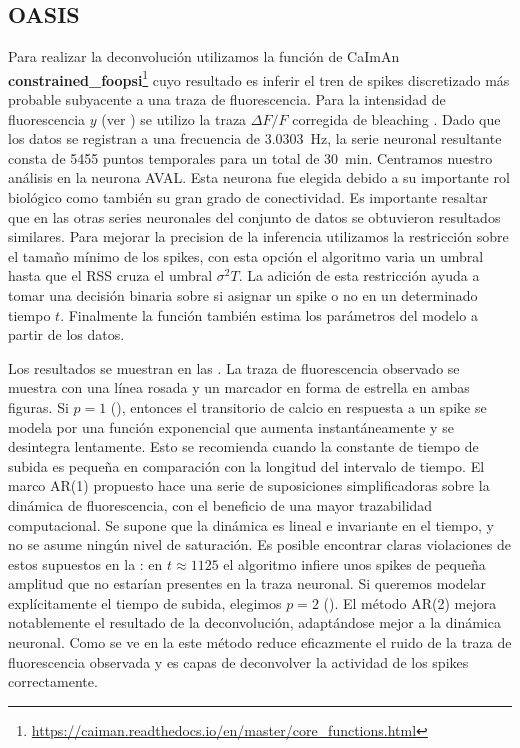  \subsection{OASIS}
 
 Para realizar la deconvolución utilizamos la función de CaImAn  \textbf{constrained\_foopsi}\footnote{\url{https://caiman.readthedocs.io/en/master/core_functions.html}}   cuyo resultado es inferir el tren de spikes discretizado más probable subyacente a una traza de fluorescencia. Para la intensidad de fluorescencia $y$ (ver ) se utilizo   la traza $\Delta F/F$ corregida de  bleaching .  Dado que los datos se registran a una frecuencia de  \qty{3.0303}{\Hz}, la serie neuronal resultante consta de 5455 puntos temporales para un total de \qty{30}{\minute}.   Centramos nuestro análisis en  la neurona AVAL.  Esta neurona fue elegida debido a su importante rol biológico   como también su gran grado de conectividad. Es importante resaltar que en las otras series neuronales del conjunto de datos se obtuvieron resultados similares.     Para mejorar  la precision de la inferencia  utilizamos la restricción sobre el tamaño mínimo de los spikes, con esta opción el algoritmo varia un umbral hasta que el RSS cruza el umbral $\sigma^2T$.    La adición de esta restricción ayuda a  tomar una decisión binaria sobre si asignar un spike o no en un determinado tiempo $t$.    Finalmente  la función también estima los parámetros    del modelo a partir de los datos.
 
 Los resultados se muestran en las .  La traza de fluorescencia observado se muestra con una línea rosada y un marcador en forma de estrella en ambas figuras.   Si $p = 1$ (), entonces el transitorio de calcio en respuesta a un spike se modela por una función exponencial que aumenta instantáneamente y se desintegra lentamente.  Esto se recomienda cuando la constante de tiempo de subida es pequeña en comparación con la longitud del intervalo de tiempo.   El marco AR(1) propuesto hace una serie de suposiciones simplificadoras sobre la dinámica de fluorescencia, con el beneficio de una mayor trazabilidad computacional. Se supone que la dinámica es lineal e invariante en el tiempo, y no se asume ningún nivel de saturación. Es posible encontrar claras violaciones de estos supuestos en la : en $t\approx1125$ el algoritmo infiere unos spikes de pequeña amplitud que no estarían presentes en la traza neuronal.     Si queremos modelar explícitamente el tiempo de subida, elegimos $p = 2$ (). El método AR(2) mejora notablemente el  resultado de la deconvolución, adaptándose mejor a la dinámica neuronal.  Como se ve en la  este método reduce eficazmente el ruido de la traza de fluorescencia observada y es  capas   de  deconvolver la actividad de los spikes correctamente. 
 
